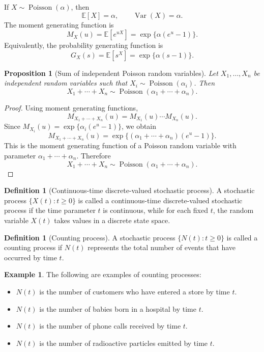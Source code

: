 \documentclass[11pt]{article}
\theoremstyle{plain}
\newtheorem{proposition}[theorem]{Proposition}
\theoremstyle{definition}
\newtheorem{definition}[theorem]{Definition}
\newtheorem{example}[theorem]{Example}
\theoremstyle{remark}
\begin{document}
If \(X\sim \operatorname{Poisson}(\alpha)\), then
\[
\mathbb{E}[X]=\alpha,
\qquad
\operatorname{Var}(X)=\alpha.
\]
The moment generating function is
\[
M_X(u)=\mathbb{E}[e^{uX}]=\exp\{\alpha(e^u-1)\}.
\]
Equivalently, the probability generating function is
\[
G_X(s)=\mathbb{E}[s^X]=\exp\{\alpha(s-1)\}.
\]

\begin{proposition}[Sum of independent Poisson random variables]
	Let \(X_1,\dots,X_n\) be independent random variables such that \(X_i\sim \operatorname{Poisson}(\alpha_i)\). Then
	\[
	X_1+\cdots+X_n
	\sim
	\operatorname{Poisson}(\alpha_1+\cdots+\alpha_n).
	\]
\end{proposition}

\begin{proof}
	Using moment generating functions,
	\[
	M_{X_1+\cdots+X_n}(u)
	=
	M_{X_1}(u)\cdots M_{X_n}(u).
	\]
	Since \(M_{X_i}(u)=\exp\{\alpha_i(e^u-1)\}\), we obtain
	\[
	M_{X_1+\cdots+X_n}(u)
	=
	\exp\{(\alpha_1+\cdots+\alpha_n)(e^u-1)\}.
	\]
	This is the moment generating function of a Poisson random variable with parameter \(\alpha_1+\cdots+\alpha_n\). Therefore
	\[
	X_1+\cdots+X_n
	\sim
	\operatorname{Poisson}(\alpha_1+\cdots+\alpha_n).
	\]
\end{proof}

\begin{definition}[Continuous-time discrete-valued stochastic process]
	A stochastic process \(\{X(t):t\ge 0\}\) is called a continuous-time discrete-valued stochastic process if the time parameter \(t\) is continuous, while for each fixed \(t\), the random variable \(X(t)\) takes values in a discrete state space.
\end{definition}

\begin{definition}[Counting process]
	A stochastic process \(\{N(t):t\ge 0\}\) is called a counting process if \(N(t)\) represents the total number of events that have occurred by time \(t\).
\end{definition}

\begin{example}
	The following are examples of counting processes:
	\begin{itemize}[leftmargin=2em]
		\item \(N(t)\) is the number of customers who have entered a store by time \(t\).
		\item \(N(t)\) is the number of babies born in a hospital by time \(t\).
		\item \(N(t)\) is the number of phone calls received by time \(t\).
		\item \(N(t)\) is the number of radioactive particles emitted by time \(t\).
	\end{itemize}
\end{example}
\end{document}
